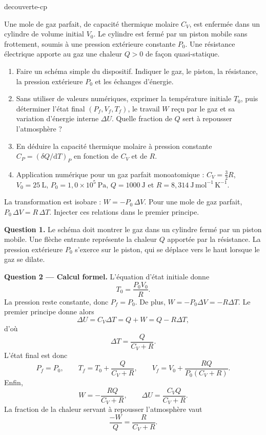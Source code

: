 \begin{exo}{decouverte-cp}

Une mole de gaz parfait, de capacité thermique molaire $C_V$, est enfermée
dans un cylindre de volume initial $V_0$. Le cylindre est fermé par un piston
mobile sans frottement, soumis à une pression extérieure constante $P_0$.
Une résistance électrique apporte au gaz une chaleur $Q>0$ de façon
quasi-statique.

\begin{enumerate}
\item Faire un schéma simple du dispositif. Indiquer le gaz, le piston, la
résistance, la pression extérieure $P_0$ et les échanges d'énergie.
\item Sans utiliser de valeurs numériques, exprimer la température initiale
$T_0$, puis déterminer l'état final $(P_f,V_f,T_f)$, le travail $W$ reçu par
le gaz et sa variation d'énergie interne $\Delta U$. Quelle fraction de $Q$
sert à repousser l'atmosphère ?
\item En déduire la capacité thermique molaire à pression constante
$C_P=(\delta Q/\mathrm{d}T)_P$ en fonction de $C_V$ et de $R$.
\item Application numérique pour un gaz parfait monoatomique :
$C_V=\frac32R$, $V_0=25\ \mathrm{L}$,
$P_0=1{,}0\times10^5\ \mathrm{Pa}$, $Q=1000\ \mathrm{J}$ et
$R=8{,}314\ \mathrm{J\,mol^{-1}\,K^{-1}}$.
\end{enumerate}

\begin{indication}
La transformation est isobare : $W=-P_0\,\Delta V$. Pour une mole de gaz
parfait, $P_0\,\Delta V=R\,\Delta T$. Injecter ces relations dans le premier
principe.
\end{indication}

\begin{solution}
\textbf{Question 1.} Le schéma doit montrer le gaz dans un cylindre fermé par
un piston mobile. Une flèche entrante représente la chaleur $Q$ apportée par
la résistance. La pression extérieure $P_0$ s'exerce sur le piston, qui se
déplace vers le haut lorsque le gaz se dilate.

\textbf{Question 2 --- Calcul formel.} L'équation d'état initiale donne
\[
T_0=\frac{P_0V_0}{R}.
\]
La pression reste constante, donc $P_f=P_0$. De plus,
$W=-P_0\Delta V=-R\Delta T$. Le premier principe donne alors
\[
\Delta U=C_V\Delta T=Q+W=Q-R\Delta T,
\]
d'où
\[
\Delta T=\frac{Q}{C_V+R}.
\]
L'état final est donc
\[
P_f=P_0,\qquad
T_f=T_0+\frac{Q}{C_V+R},\qquad
V_f=V_0+\frac{RQ}{P_0(C_V+R)}.
\]
Enfin,
\[
W=-\frac{RQ}{C_V+R},
\qquad
\Delta U=\frac{C_VQ}{C_V+R}.
\]
La fraction de la chaleur servant à repousser l'atmosphère vaut
\[
\frac{-W}{Q}=\frac{R}{C_V+R}.
\]


\end{solution}
\end{exo}
